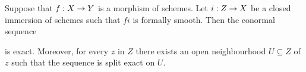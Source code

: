\begin{theorem}\label{theorem:splitting of conormal sequence}
Suppose that $f:X\rightarrow Y$ is a morphism of schemes. Let $i:Z\rightarrow X$ be a closed immersion of schemes such that $fi$ is formally smooth. Then the conormal sequence
\begin{center}
\end{center}  
is exact. Moreover, for every $z$ in $Z$ there exists an open neighbourhood $U\subseteq Z$ of $z$ such that the sequence is split exact on $U$.
\end{theorem}
